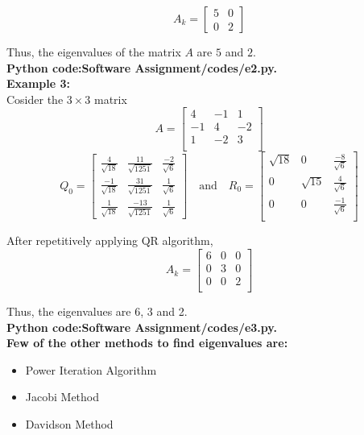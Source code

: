 \documentclass[journal]{IEEEtran}
\begin{document}
\[
A_k = \begin{bmatrix}
	5 & 0 \\
	0 & 2
\end{bmatrix}
\]

Thus, the eigenvalues of the matrix \( A \) are \( 5 \) and \( 2 \).\\
\textbf{Python code:Software Assignment/codes/e2.py.}\\

\textbf{Example 3:}\\
Cosider the $3 \times 3$ matrix
\[
	A=\begin{bmatrix}
		4 & -1 & 1\\
		-1 & 4 & -2\\
		1 & -2 & 3\\
	\end{bmatrix}
\]
\[
Q_0 = \begin{bmatrix}
	\frac{4}{\sqrt{18}} & \frac{11}{\sqrt{1251}} & \frac{-2}{\sqrt{6}} \\
	\frac{-1}{\sqrt{18}} & \frac{31}{\sqrt{1251}} & \frac{1}{\sqrt{6}}\\
	\frac{1}{\sqrt{18}} & \frac{-13}{\sqrt{1251}} & \frac{1}{\sqrt{6}}
\end{bmatrix}
\quad \text{and} \quad
R_0 = \begin{bmatrix}
	\sqrt{18} & 0 & \frac{-8}{\sqrt{6}} \\
	0 & \sqrt{15} & \frac{4}{\sqrt{6}}\\
	0 & 0 & \frac{-1}{\sqrt{6}}\\
\end{bmatrix}
\]

After repetitively applying QR algorithm,\\
\[
	A_k=\begin{bmatrix}
		6 & 0 & 0\\
		0 & 3 & 0\\
		0 & 0 & 2\\
	\end{bmatrix}
\]

Thus, the eigenvalues are 6, 3 and 2.\\
\textbf{Python code:Software Assignment/codes/e3.py.}\\

\textbf{Few of the other methods to find eigenvalues are:}
\begin{itemize}
	\item Power Iteration Algorithm
	\item Jacobi Method
	\item Davidson Method\\
\end{itemize}
\end{document}
